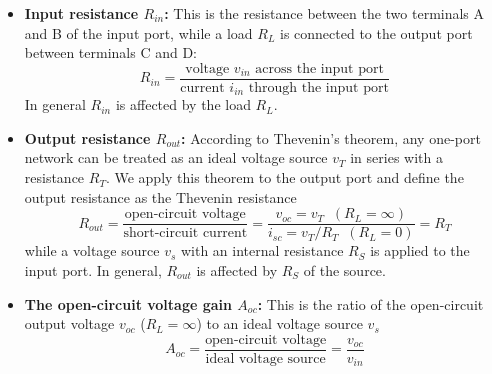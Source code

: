 \documentclass{article}
\begin{document}
\begin{itemize}
  \begin{itemize}
  \item {\bf Input resistance $R_{in}$:} This is the resistance between 
    the two terminals A and B of the input port, while a load $R_L$ is 
    connected to the output port between terminals C and D:
    \begin{equation} 
      R_{in}=\frac{\mbox{voltage $v_{in}$ across the input port}}
      {\mbox{current $i_{in}$ through the input port}} 
    \end{equation}
    In general $R_{in}$ is affected by the load $R_L$.
  \item {\bf Output resistance $R_{out}$:} According to Thevenin's theorem, 
    any one-port network can be treated as an ideal voltage source $v_T$ in 
    series with a resistance $R_T$. We apply this theorem to the output port
    and define the output resistance as the Thevenin resistance 
    \begin{equation}
      R_{out}=\frac{\mbox{open-circuit voltage}}{\mbox{short-circuit current}}
      =\frac{v_{oc}=v_T\;\;(R_L=\infty)}{i_{sc}=v_T/R_T\;\;(R_L=0)}=R_T
    \end{equation}
    while a voltage source $v_s$ with an internal resistance $R_S$ is applied 
    to the input port. In general, $R_{out}$ is affected by $R_S$ of the source.
  \item {\bf The open-circuit voltage gain $A_{oc}$:} This is the ratio of the 
    open-circuit output voltage $v_{oc}$ ($R_L=\infty$) to an ideal voltage 
    source $v_s$ 
    \begin{equation}
      A_{oc}=\frac{\mbox{open-circuit voltage}}{\mbox{ideal voltage source}}
      =\frac{v_{oc}}{v_{in}}
    \end{equation}
  \end{itemize}

  \begin{comment}
  The performance of such a circuit containing active components can also
  be described by terms such as ``voltage gain'' $G_V$, ``current gain'' 
  $G_I$, and ``power gain'' $G_P$, which can be found based on the specific
  circuits. They are defined as below:
  \begin{itemize}
  \item {\bf Voltage gain $G_V$:} defined as the ratio of the output 
    voltage to the source voltage:
    \begin{equation}
      G_V=\frac{v_{out}}{v_s}
      =A\frac{r_{in}}{R_S+r_{in}} \frac{R_L}{R_L+r_{out}} 
    \end{equation}
    For the output of the voltage amplifier to be as high as possible,
    we would like to have ideally $r_{in}=\infty$ and $r_{out}=0$, so that
    the output voltage is maximized $v_{out}=A v_s$ and the gain is $G_V=A$.


\end{comment}
\end{itemize}
\end{document}
